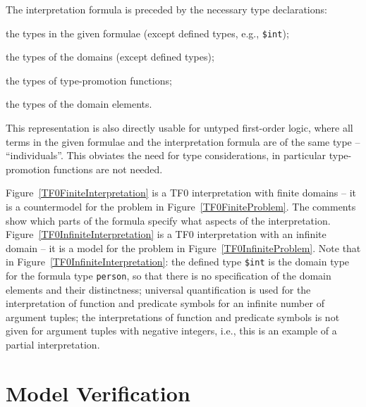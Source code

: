 \documentclass{easychair}
\newcommand{\smalltt}[1]{\small \texttt{#1}}
\newenvironment{packed_itemize}{
\vspace*{-0.2em}
\begin{itemize}
\setlength{\partopsep}{0pt}
\setlength{\itemsep}{1pt}
\setlength{\parskip}{0pt}
\setlength{\parsep}{0pt}
}{\end{itemize}}
\begin{document}
The interpretation formula is preceded by the necessary type declarations:
\begin{packed_itemize}
\item the types in the given formulae (except defined types, e.g., {\smalltt{\$int}});
\item the types of the domains (except defined types);
\item the types of type-promotion functions;
\item the types of the domain elements.
\end{packed_itemize}
This representation is also directly usable for untyped first-order logic, where all terms in 
the given formulae and the interpretation formula are of the same type – ``individuals''. 
This obviates the need for type considerations, in particular type-promotion functions are not 
needed.

Figure~\ref{TF0FiniteInterpretation} is a TF0 interpretation with finite domains -- it is a 
countermodel for the problem in Figure~\ref{TF0FiniteProblem}.
The comments show which parts of the formula specify what aspects of the interpretation.
Figure~\ref{TF0InfiniteInterpretation} is a TF0 interpretation with an infinite domain -- it 
is a model for the problem in Figure~\ref{TF0InfiniteProblem}.
Note that in Figure~\ref{TF0InfiniteInterpretation}:
the defined type {\smalltt{\$int}} is the domain type for the formula type 
{\smalltt{person}}, so that there is no specification of the domain elements and their 
distinctness;
universal quantification is used for the interpretation of function and predicate
symbols for an infinite number of argument tuples;
the interpretations of function and predicate symbols is not given for argument 
tuples with negative integers, i.e., this is an example of a partial interpretation.

\section{Model Verification}
\label{Verification}
\end{document}
